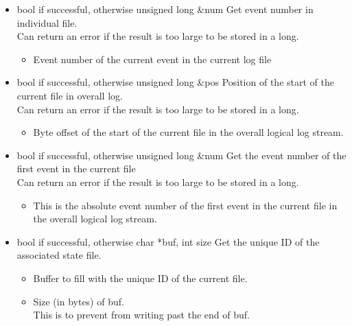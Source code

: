 \begin{itemize}
\begin{itemize}
\item {}
  {bool} { if successful,  otherwise}
  {unsigned long \&num}
  {Get event number in individual file.
    \\ \Note Can return an error if the result is too large to be
    stored in a long.}
  \begin{itemize}
  \item {}
    Event number of the current event in the current log file
  \end{itemize}

\item {}
  {bool} { if successful,  otherwise}
  {unsigned long \&pos}
  {Position of the start of the current file in overall log.
    \\ \Note Can return an error if the result is too large
    to be stored in a long.}
  \begin{itemize}
  \item {}
    Byte offset of the start of the current file in the overall
    logical log stream.
  \end{itemize}

\item {}
  {bool} { if successful,  otherwise}
  {unsigned long \&num}
  {Get the event number of the first event in the current file
    \\ \Note Can return an error if the result is too large
    to be stored in a long.}
  \begin{itemize}
  \item {}
    This is the absolute event number of the first event in the
    current file in the overall logical log stream.
  \end{itemize}

\item {}
  {bool} { if successful,  otherwise}
  {char *buf, int size}
  {Get the unique ID of the associated state file.}
  \begin{itemize}
  \item {}
    Buffer to fill with the unique ID of the current file.
  \item {}
    Size (in bytes) of buf.
    \\ This is to prevent 
    from writing past the end of buf.
  \end{itemize}


\end{itemize}
\end{itemize}

